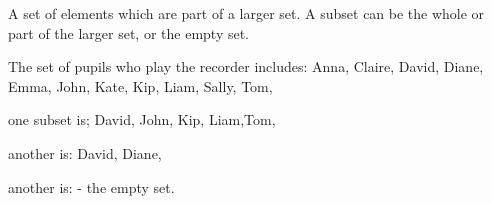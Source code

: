 A set of elements which are part of a larger set. 
A subset can be the whole or part of the larger set, or the empty set.

\par
The set of pupils who play the recorder includes:
 {Anna, Claire, David, Diane, Emma, John, Kate, Kip, Liam, Sally, Tom}, 
\par
one subset is; 
{David, John, Kip, Liam,Tom}, 
\par
another is:
{David, Diane}, 
\par
another is:
{}- the empty set.